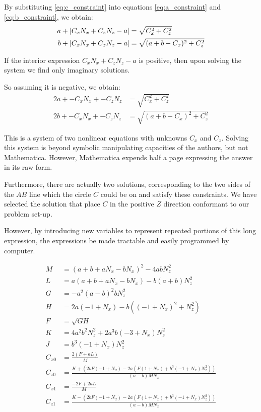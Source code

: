 \documentclass{article}
\begin{document}
By substituting \ref{eq:c_constraint} into equations
\ref{eq:a_constraint} and \ref{eq:b_constraint},
we obtain:
\begin{align}
  a + \left\lvert C_x N_x + C_z N_z - a\right\rvert &= \sqrt{C_x^2 + C_z^2} \\
  b + \left\lvert C_x N_x + C_z N_z - a\right\rvert &= \sqrt{(a+b-C_x)^2 + C_z^2}
\end{align}

If the interior expression $C_x N_x + C_z N_z - a$ is positive,
then upon solving the system we find only imaginary solutions.

So assuming it is negative, we obtain:
\begin{align}
  2a + -C_x N_x + -C_z N_z  &= \sqrt{C_x^2 + C_z ^2} \\
  2b + -C_x N_x + -C_z N_z  &= \sqrt{(a+b-C_x)^2 + C_z^2}
\end{align}

This is a system of two nonlinear equations with unknowns $C_x$ and $C_z$.
Solving this system is beyond symbolic manipulating capacities of the authors,
but not Mathematica.
However, Mathematica expends half a page expressing the answer
in its raw form.

Furthermore, there are actually two solutions, corresponding
to the two sides of the $AB$ line which the circle $C$ could be
on and satisfy these constraints.
We have selected the solution that place $C$ in the positive $Z$
direction conformant to our problem set-up.

However, by introducing new variables to represent repeated
portions of this long expression, the expressions be
made tractable and easily programmed by computer.

\begin{align}
M &= (a + b + a N_x - b N_x)^2 - 4 a b N_z^2 \\
L &= a (a + b + a N_x - b N_x) - b (a + b) N_z^2 \\
G &= -a^2 (a - b)^2 b N_z^2 \\
H &= 2 a (-1 + N_x) - b ((-1 + N_x)^2 + N_z^2) \\
F &= \sqrt{G H} \\
K &= 4 a^2 b^2 N_z^2 + 2 a^3 b (-3 + N_x) N_z^2 \\
J &= b^3 (-1 + N_x) N_z^2 \\
C_{x0} &= \frac{2 (F + a L)}{M} \\
C_{z0} &= \frac{K + (2 b F (-1 + N_x) -
  2 a (F (1 + N_x) + b^3 (-1 + N_x) N_z^2))}
{(a -  b) M N_z} \\
C_{x1} &= \frac{-2 F + 2 a L}{M} \\
  C_{z1} &= \frac{K - (2 b F (-1 + N_x) -
  2 a (F (1 + N_x) + b^3 (-1 + N_x) N_z^2))}
  {(a - b) M N_z}
\end{align}
\end{document}
